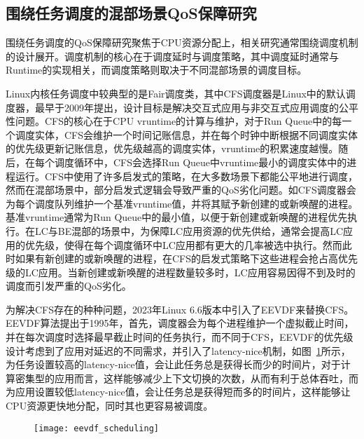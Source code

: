 \subsection{围绕任务调度的混部场景QoS保障研究}


围绕任务调度的QoS保障研究聚焦于CPU资源分配上，相关研究通常围绕调度机制的设计展开。调度机制的核心在于调度延时与调度策略，其中调度延时通常与Runtime的实现相关，而调度策略则取决于不同混部场景的调度目标。

Linux内核任务调度中较典型的是Fair调度类，其中CFS调度器\citep{pabla2009completely}是Linux中的默认调度器，最早于2009年提出，设计目标是解决交互式应用与非交互式应用调度的公平性问题。CFS的核心在于CPU vruntime的计算与维护，对于Run Queue中的每一个调度实体，CFS会维护一个时间记账信息，并在每个时钟中断根据不同调度实体的优先级更新记账信息，优先级越高的调度实体，vruntime的积累速度越慢。随后，在每个调度循环中，CFS会选择Run Queue中vruntime最小的调度实体中的进程运行。CFS中使用了许多启发式的策略，在大多数场景下都能公平地进行调度，然而在混部场景中，部分启发式逻辑会导致严重的QoS劣化问题。如CFS调度器会为每个调度队列维护一个基准vruntime值，并将其赋予新创建的或新唤醒的进程。基准vruntime通常为Run Queue中的最小值，以便于新创建或新唤醒的进程优先执行。在LC与BE混部的场景中，为保障LC应用资源的优先供给，通常会提高LC应用的优先级，使得在每个调度循环中LC应用都有更大的几率被选中执行。然而此时如果有新创建的或新唤醒的进程，在CFS的启发式策略下这些进程会抢占高优先级的LC应用。当新创建或新唤醒的进程数量较多时，LC应用容易因得不到及时的调度而引发严重的QoS劣化。

为解决CFS存在的种种问题，2023年Linux 6.6版本中引入了EEVDF来替换CFS。EEVDF算法\citep{stoica1995earliest}提出于1995年，首先，调度器会为每个进程维护一个虚拟截止时间，并在每次调度时选择最早截止时间的任务执行，而不同于CFS，EEVDF的优先级设计考虑到了应用对延迟的不同需求，并引入了latency-nice机制，如图~\ref{fig:eevdf_scheduling}所示，为任务设置较高的latency-nice值，会让此任务总是获得长而少的时间片，对于计算密集型的应用而言，这样能够减少上下文切换的次数，从而有利于总体吞吐，而为应用设置较低latency-nice值，会让任务总是获得短而多的时间片，这样能够让CPU资源更快地分配，同时其也更容易被调度。

\begin{figure}[!htbp]
    \centering
    \texttt{[image: eevdf\_scheduling]}
    \label{fig:eevdf_scheduling}
\end{figure}

